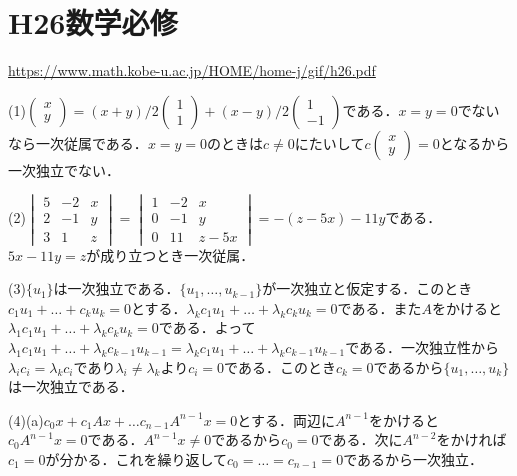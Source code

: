 \documentclass[
		book,
		head_space=20mm,
		foot_space=20mm,
		gutter=10mm,
		line_length=190mm
]{jlreq}
\begin{document}
\section{H26数学必修}
\url{https://www.math.kobe-u.ac.jp/HOME/home-j/gif/h26.pdf}

(1)$\begin{pmatrix}
    x \\y
    \end{pmatrix}=(x+y)/2 \begin{pmatrix}
        1\\1
    \end{pmatrix}+(x-y)/2 \begin{pmatrix}
        1\\-1
    \end{pmatrix}$である．$x=y=0$でないなら一次従属である．$x=y=0$のときは$c\neq 0$にたいして$c \begin{pmatrix}
        x \\y
    \end{pmatrix}=0$となるから一次独立でない．

(2)$\begin{vmatrix}
    5 & -2 & x \\
    2 & -1 & y \\
    3 & 1 & z
\end{vmatrix}=\begin{vmatrix}
    1 & -2 & x \\
    0 & -1 & y\\
    0 & 11 & z-5x
\end{vmatrix}=-(z-5x)-11y$である．$5x-11y=z$が成り立つとき一次従属．

(3)$\{ u_1\}$は一次独立である．$\{ u_1,\dots,u_{k-1}\}$が一次独立と仮定する．このとき$c_1u_1+\dots+c_ku_k=0$とする．$\lambda_kc_1u_1+\dots+\lambda_kc_ku_k=0$である．また$A$をかけると$\lambda_1c_1u_1+\dots+\lambda_kc_ku_k=0$である．よって$\lambda_1c_1u_1+\dots+\lambda_kc_{k-1}u_{k-1}=\lambda_kc_1u_1+\dots+\lambda_kc_{k-1}u_{k-1}$である．一次独立性から$\lambda_ic_i=\lambda_kc_i$であり$\lambda_i\neq \lambda_k$より$c_i=0$である．このとき$c_k=0$であるから$\{u_1,\dots,u_k\}$は一次独立である．

(4)(a)$c_0x+c_1Ax+\dots c_{n-1}A^{n-1}x=0$とする．両辺に$A^{n-1}$をかけると$c_0A^{n-1}x=0$である．$A^{n-1}x\neq 0$であるから$c_0=0$である．次に$A^{n-2}$をかければ$c_1=0$が分かる．これを繰り返して$c_0=\dots=c_{n-1}=0$であるから一次独立．
\end{document}
